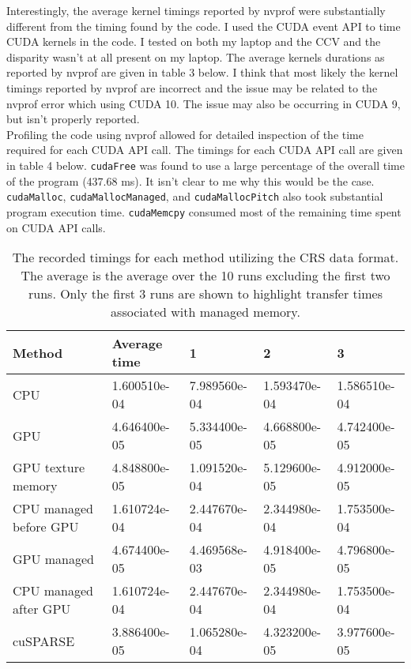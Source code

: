 \documentclass{article}
\begin{document}
Interestingly, the average kernel timings reported by nvprof were substantially
different from the timing found by the code. I used the CUDA event API to time
CUDA kernels in the code. I tested on both my laptop and the CCV and the
disparity wasn't at all present on my laptop. The average kernels durations as
reported by nvprof are given in table 3 below. I think that most likely the
kernel timings reported by nvprof are incorrect and the issue may be related to
the nvprof error which using CUDA 10. The issue may also be occurring in CUDA
9, but isn't properly reported.  \\ 

Profiling the code using nvprof allowed for detailed inspection of the time
required for each CUDA API call. The timings for each CUDA API call are given
in table 4 below. \texttt{cudaFree} was found to use a large percentage of the
overall time of the program (437.68 ms). It isn't clear to me why this would be
the case. \texttt{cudaMalloc}, \texttt{cudaMallocManaged}, and
\texttt{cudaMallocPitch} also took substantial program execution time.
\texttt{cudaMemcpy} consumed most of the remaining time spent on CUDA API
calls. \\


\begin{table}[] 
  \centering 
  \begin{tabular}{|l|l|l|l|l|} 
    \hline Method               & Average time & 1            & 2            & 3 \\
    \hline CPU                      & 1.600510e-04 & 7.989560e-04 & 1.593470e-04 & 1.586510e-04 \\
    \hline GPU                      & 4.646400e-05 & 5.334400e-05 & 4.668800e-05 & 4.742400e-05 \\
    \hline GPU texture memory     & 4.848800e-05 & 1.091520e-04 & 5.129600e-05 & 4.912000e-05 \\
    \hline CPU managed before GPU & 1.610724e-04 & 2.447670e-04 & 2.344980e-04 & 1.753500e-04 \\
    \hline GPU managed            & 4.674400e-05 & 4.469568e-03 & 4.918400e-05 & 4.796800e-05 \\
    \hline CPU managed after GPU  & 1.610724e-04 & 2.447670e-04 & 2.344980e-04 & 1.753500e-04 \\
    \hline cuSPARSE                 & 3.886400e-05 & 1.065280e-04 & 4.323200e-05 & 3.977600e-05 \\ \hline
  \end{tabular} 
  \caption{The recorded timings for each method utilizing the CRS
    data format. The average is the average over the 10 runs excluding the first
    two runs. Only the first 3 runs are shown to highlight transfer times
  associated with managed memory.} 
\end{table}
\end{document}
